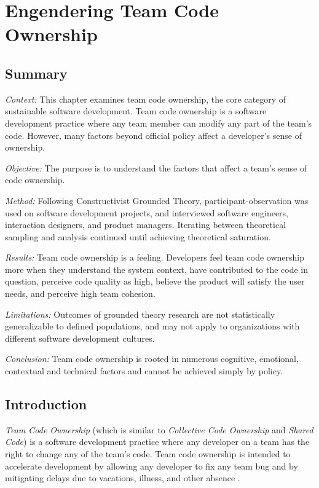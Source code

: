 \chapter{Engendering Team Code Ownership}
\label{TeamCodeOwnershipChapter}

\section{Summary}

\textit{Context:} This chapter examines team code ownership, the core category of sustainable software development. Team code ownership is a software development practice where any team member can modify any part of the team's code. However, many factors beyond official policy affect a developer's sense of ownership. 

\textit{Objective:} The purpose is to understand the factors that affect a team's sense of code ownership.

\textit{Method:} Following Constructivist Grounded Theory, participant-observation was used on \numberOfObservedProjects{} software development projects, and interviewed \numberOfInterviews{} software engineers, interaction designers, and product managers. Iterating between theoretical sampling and analysis continued until achieving theoretical saturation.

\textit{Results:} Team code ownership is a feeling. Developers feel team code ownership more when they understand the system context, have contributed to the code in question, perceive code quality as high, believe the product will satisfy the user needs, and perceive high team cohesion.  

\textit{Limitations:} Outcomes of grounded theory research are not statistically generalizable to defined populations, and may not apply to organizations with different software development cultures.

\textit{Conclusion:} Team code ownership is rooted in numerous cognitive, emotional, contextual and technical factors and cannot be achieved simply by policy. 

\section{Introduction}
\textit{Team Code Ownership} (which is similar to \textit{Collective Code Ownership} and \textit{Shared Code}) is a software development practice where any developer on a team has the right to change any of the team's code. Team code ownership is intended to accelerate development by allowing any developer to fix any team bug and by mitigating delays due to vacations, illness, and other absence \cite{BeckExtremeProgramming2004}.
 
